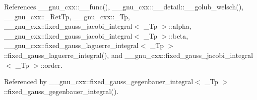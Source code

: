 References \+\_\+\+\_\+gnu\+\_\+cxx\+::\+\_\+\+\_\+func(), \+\_\+\+\_\+gnu\+\_\+cxx\+::\+\_\+\+\_\+detail\+::\+\_\+\+\_\+golub\+\_\+welsch(), \+\_\+\+\_\+gnu\+\_\+cxx\+::\+\_\+\+Ret\+Tp, \+\_\+\+\_\+gnu\+\_\+cxx\+::\+\_\+\+Tp, \+\_\+\+\_\+gnu\+\_\+cxx\+::fixed\+\_\+gauss\+\_\+jacobi\+\_\+integral$<$ \+\_\+\+Tp $>$\+::alpha, \+\_\+\+\_\+gnu\+\_\+cxx\+::fixed\+\_\+gauss\+\_\+jacobi\+\_\+integral$<$ \+\_\+\+Tp $>$\+::beta, \+\_\+\+\_\+gnu\+\_\+cxx\+::fixed\+\_\+gauss\+\_\+laguerre\+\_\+integral$<$ \+\_\+\+Tp $>$\+::fixed\+\_\+gauss\+\_\+laguerre\+\_\+integral(), and \+\_\+\+\_\+gnu\+\_\+cxx\+::fixed\+\_\+gauss\+\_\+jacobi\+\_\+integral$<$ \+\_\+\+Tp $>$\+::order.



Referenced by \+\_\+\+\_\+gnu\+\_\+cxx\+::fixed\+\_\+gauss\+\_\+gegenbauer\+\_\+integral$<$ \+\_\+\+Tp $>$\+::fixed\+\_\+gauss\+\_\+gegenbauer\+\_\+integral().


